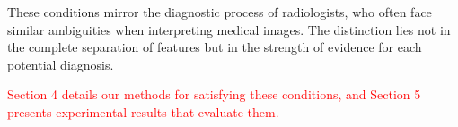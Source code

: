 \documentclass[preprint,7pt, a4paper]{elsarticle}
\begin{document}



These conditions mirror the diagnostic process of radiologists, who often face similar ambiguities when interpreting medical images. The distinction lies not in the complete separation of features but in the strength of evidence for each potential diagnosis.

\textcolor{red}{Section 4 details our methods for satisfying these conditions, and Section 5 presents experimental results that evaluate them.}
\end{document}
